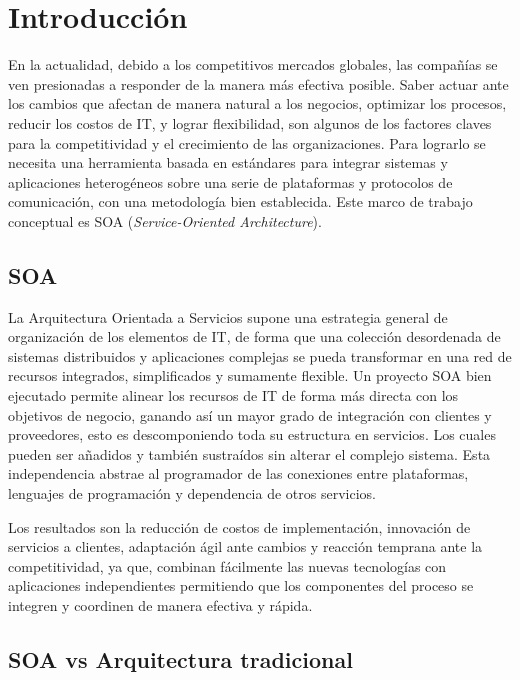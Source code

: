 \documentclass[conference]{IEEEtran}
\begin{document}
\section{Introducción}


En la actualidad, debido a los competitivos mercados globales, las
compañías se ven presionadas a responder de la manera más efectiva
posible. Saber actuar ante los cambios que afectan de manera natural a
los negocios, optimizar los procesos, reducir los costos de IT, y
lograr flexibilidad, son algunos de los factores claves para la
competitividad y el crecimiento de las organizaciones.
Para lograrlo se necesita una herramienta basada en estándares para
integrar sistemas y aplicaciones heterogéneos sobre una serie de
plataformas y protocolos de comunicación, con una metodología bien
establecida. Este marco de trabajo conceptual es SOA
(\textsl{Service-Oriented Architecture}).

\subsection{SOA}
\label{sec:intro-soa}

La Arquitectura Orientada a Servicios supone una estrategia general de
organización de los
elementos de IT, de forma que una colección desordenada de sistemas
distribuidos y aplicaciones complejas se pueda transformar en una red
de recursos integrados, simplificados y sumamente
flexible\cite{SOA1}. Un
proyecto SOA bien ejecutado permite alinear los recursos de IT de
forma más directa con los objetivos de negocio, ganando así un mayor
grado de integración con clientes y proveedores, esto es
descomponiendo toda su estructura en servicios. Los cuales pueden ser
añadidos y también sustraídos sin alterar el complejo sistema. Esta
independencia abstrae al programador de las conexiones entre
plataformas, lenguajes de programación y dependencia de otros
servicios.

Los resultados son la reducción de costos de implementación,
innovación de servicios a clientes, adaptación ágil ante cambios y
reacción temprana ante la competitividad, ya que, combinan fácilmente
las nuevas tecnologías con aplicaciones independientes permitiendo
que los componentes del proceso se integren y coordinen de manera
efectiva y rápida. 

\subsection{SOA vs Arquitectura tradicional}
\label{sec:soa-vs-arq-tra}
\end{document}
